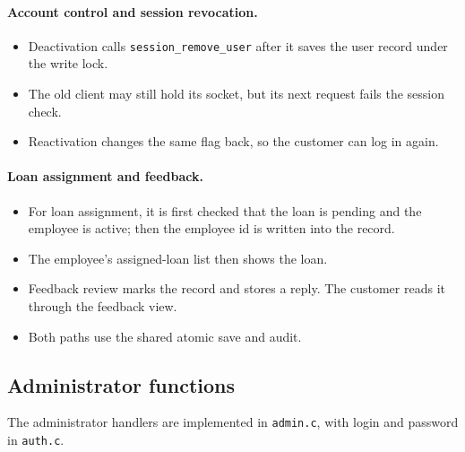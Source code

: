 \documentclass[11pt,a4paper]{article}
\begin{document}
\paragraph{Account control and session revocation.}
\begin{itemize}
\item Deactivation calls \texttt{session\_remove\_user} after it saves the user record under the write lock.
\item The old client may still hold its socket, but its next request fails the session check.
\item Reactivation changes the same flag back, so the customer can log in again.
\end{itemize}

\paragraph{Loan assignment and feedback.}
\begin{itemize}
\item For loan assignment, it is first checked that the loan is pending and the employee is active; then the employee id is written into the record.
\item The employee's assigned-loan list then shows the loan.
\item Feedback review marks the record and stores a reply. The customer reads it through the feedback view.
\item Both paths use the shared atomic save and audit.
\end{itemize}

\subsection{Administrator functions}

The administrator handlers are implemented in \texttt{admin.c}, with login and password in \texttt{auth.c}.
\end{document}
